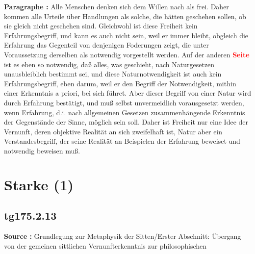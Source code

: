 \documentclass[a4paper,12pt,twoside]{book}
\newcommand{\match}[1]{\textcolor{red}{\textbf{#1}}}
\newcommand{\unnumberedsection}[1]{
	\section*{#1}
	\addcontentsline{toc}{section}{#1}
	\markright{#1}
}
\begin{document}
	\noindent\textbf{Paragraphe : }Alle Menschen denken sich dem Willen nach als frei. Daher kommen alle Urteile über Handlungen als solche, die hätten geschehen sollen, ob sie gleich nicht geschehen sind. Gleichwohl ist diese Freiheit kein Erfahrungsbegriff, und kann es auch nicht sein, weil er immer bleibt, obgleich die Erfahrung das Gegenteil von denjenigen Foderungen zeigt, die unter Voraussetzung derselben als notwendig vorgestellt werden. Auf der anderen \match{Seite} ist es eben so notwendig, daß alles, was geschieht, nach Naturgesetzen unausbleiblich bestimmt sei, und diese Naturnotwendigkeit ist auch kein Erfahrungsbegriff, eben darum, weil er den Begriff der Notwendigkeit, mithin einer Erkenntnis a priori, bei sich führet. Aber dieser Begriff von einer Natur wird durch Erfahrung bestätigt, und muß selbst unvermeidlich vorausgesetzt werden, wenn Erfahrung, d.i. nach allgemeinen Gesetzen zusammenhängende Erkenntnis der Gegenstände der Sinne, möglich sein soll. Daher ist Freiheit nur eine Idee der Vernunft, deren objektive Realität an sich zweifelhaft ist, Natur aber ein Verstandesbegriff, der seine Realität an Beispielen der Erfahrung beweiset und notwendig beweisen muß. 
	
	\unnumberedsection{Starke (1)} 
	\subsection*{tg175.2.13} 
	\textbf{Source : }Grundlegung zur Metaphysik der Sitten/Erster Abschnitt: Übergang von der gemeinen sittlichen Vernunfterkenntnis zur philosophischen\\  
	
\end{document}
